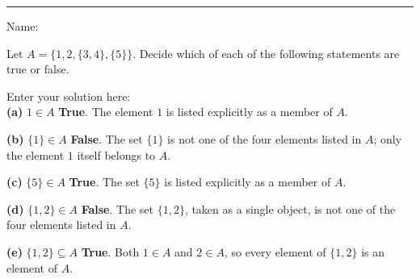 \documentclass[10pt]{exam}
\begin{document}
\hrule

\vspace{.50cm} Name:
\vspace{.25cm}
\begin{questions}

\question Let $A = \{1, 2, \{3,4\}, \{5\}\}$. Decide which of each of the following statements are true or false.


\begin{solution}
Enter your solution here:\\
\textbf{(a)} $1 \in A$ \quad \textbf{True}. The element $1$ is listed explicitly as a member of $A$.

\textbf{(b)} $\{1\} \in A$ \quad \textbf{False}. The set $\{1\}$ is not one of the four elements listed in $A$; only the element $1$ itself belongs to $A$.

\textbf{(c)} $\{5\} \in A$ \quad \textbf{True}. The set $\{5\}$ is listed explicitly as a member of $A$.

\textbf{(d)} $\{1,2\} \in A$ \quad \textbf{False}. The set $\{1,2\}$, taken as a single object, is not one of the four elements listed in $A$.

\textbf{(e)} $\{1,2\} \subseteq A$ \quad \textbf{True}. Both $1 \in A$ and $2 \in A$, so every element of $\{1,2\}$ is an element of $A$.


\end{solution}
\end{questions}
\end{document}
